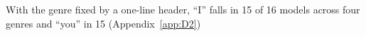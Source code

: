 With the genre fixed by a one-line header, ``I'' falls in 15 of 16 models across four genres and ``you'' in 15 (Appendix~\ref{app:D2})